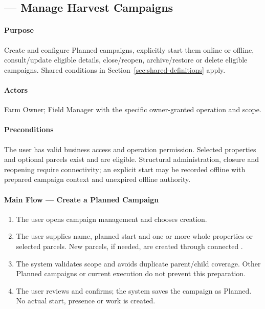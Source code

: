 \subsection{ --- Manage Harvest Campaigns}
\label{uc:06}
\paragraph{Purpose}
Create and configure Planned campaigns, explicitly start them online or offline,
consult/update eligible details, close/reopen, archive/restore or delete eligible
campaigns. Shared conditions in Section~\ref{sec:shared-definitions} apply.
\paragraph{Actors}
Farm Owner; Field Manager with the specific owner-granted operation and scope.
\paragraph{Preconditions}
The user has valid business access and operation permission. Selected properties
and optional parcels exist and are eligible. Structural administration, closure
and reopening require connectivity; an explicit start may be recorded offline
with prepared campaign context and unexpired offline authority.
\paragraph{Main Flow --- Create a Planned Campaign}
\begin{enumerate}
\item The user opens campaign management and chooses creation.
\item The user supplies name, planned start and one or more whole properties or
selected parcels. New parcels, if needed, are created through connected .
\item The system validates scope and avoids duplicate parent/child coverage.
Other Planned campaigns or current execution do not prevent this preparation.
\item The user reviews and confirms; the system saves the campaign as Planned.
No actual start, presence or work is created.
\end{enumerate}
